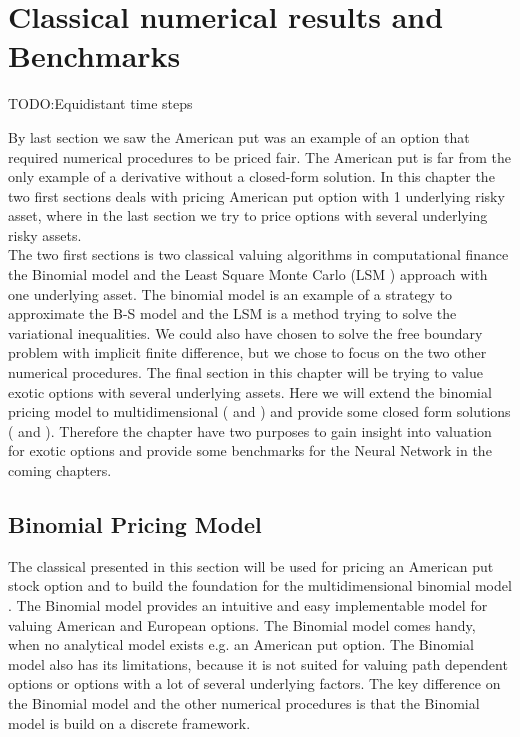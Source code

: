 
\chapter{Classical numerical results and Benchmarks} %

TODO:Equidistant time steps

\label{Chapter3} %

By last section we saw the American put was an example of an option that required numerical procedures to be priced fair. The American put is far from the only example of a derivative without a closed-form solution. In this chapter the two first sections deals with pricing American put option with 1 underlying risky asset, where in the last section we try to price options with several underlying risky assets. \\

The two first sections is two classical valuing algorithms in computational finance the Binomial model \parencite{CRR} and the Least Square Monte Carlo (LSM \parencite{lsm}) approach with one underlying asset. The binomial model is an example of a strategy to approximate the B-S model and the LSM is a method trying to solve the variational inequalities. We could also have chosen to solve the free boundary problem with implicit finite difference, but we chose to focus on the two other numerical procedures. The final section in this chapter will be trying to value exotic options with several underlying assets. Here we will extend the binomial pricing model to multidimensional (\parencite{NEK} and \parencite{BEG}) and provide some closed form solutions (\parencite{Johnson87} and \parencite{Ouwehand2006}). Therefore the chapter have two purposes to gain insight into valuation for exotic options and provide some benchmarks for the Neural Network in the coming chapters.

\section{Binomial Pricing Model}
The classical \parencite{CRR} presented in this section will be used for pricing an American put stock option and to build the foundation for the multidimensional binomial model \parencite{BEG}.
The Binomial model provides an intuitive and easy implementable model for valuing American and European options. The Binomial model comes handy, when no analytical model exists e.g. an American put option. The Binomial model also has its limitations, because it is not suited for valuing path dependent options or options with a lot of several underlying factors. The key difference on the Binomial model and the other numerical procedures is that the Binomial model is build on a discrete framework. \\

